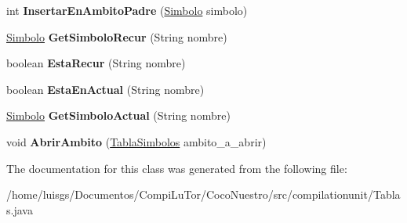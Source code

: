 \begin{DoxyCompactItemize}
\item 
\hypertarget{classcompilationunit_1_1_tablas_a4d93471ce954ae86bc5bc98f64a1ae42}{
int {\bfseries InsertarEnAmbitoPadre} (\hyperlink{classcompilationunit_1_1_simbolo}{Simbolo} simbolo)}
\label{classcompilationunit_1_1_tablas_a4d93471ce954ae86bc5bc98f64a1ae42}

\item 
\hypertarget{classcompilationunit_1_1_tablas_a20f02d123e055b13678f71899cf12803}{
\hyperlink{classcompilationunit_1_1_simbolo}{Simbolo} {\bfseries GetSimboloRecur} (String nombre)}
\label{classcompilationunit_1_1_tablas_a20f02d123e055b13678f71899cf12803}

\item 
\hypertarget{classcompilationunit_1_1_tablas_a5d1e46341928e47cb40085e45d3121b8}{
boolean {\bfseries EstaRecur} (String nombre)}
\label{classcompilationunit_1_1_tablas_a5d1e46341928e47cb40085e45d3121b8}

\item 
\hypertarget{classcompilationunit_1_1_tablas_ad53bee73def9dc52406d9dafa2fd3297}{
boolean {\bfseries EstaEnActual} (String nombre)}
\label{classcompilationunit_1_1_tablas_ad53bee73def9dc52406d9dafa2fd3297}

\item 
\hypertarget{classcompilationunit_1_1_tablas_af8a22e50fe59c96448e44c5892c31176}{
\hyperlink{classcompilationunit_1_1_simbolo}{Simbolo} {\bfseries GetSimboloActual} (String nombre)}
\label{classcompilationunit_1_1_tablas_af8a22e50fe59c96448e44c5892c31176}

\item 
\hypertarget{classcompilationunit_1_1_tablas_a50c78f1c47ce210d7760c10f767d4570}{
void {\bfseries AbrirAmbito} (\hyperlink{classcompilationunit_1_1_tabla_simbolos}{TablaSimbolos} ambito\_\-a\_\-abrir)}
\label{classcompilationunit_1_1_tablas_a50c78f1c47ce210d7760c10f767d4570}

\end{DoxyCompactItemize}


The documentation for this class was generated from the following file:\begin{DoxyCompactItemize}
\item 
/home/luisgs/Documentos/CompiLuTor/CocoNuestro/src/compilationunit/Tablas.java\end{DoxyCompactItemize}
